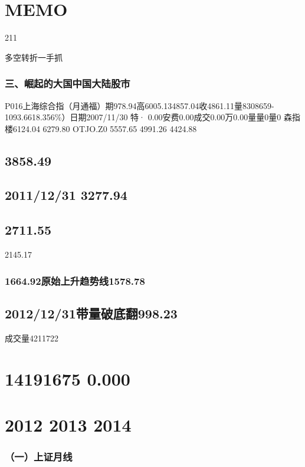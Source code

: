 \documentclass{article}
\begin{document}
\section{MEMO}

211

\clearpage

多空转折一手抓

\subsubsection{三、崛起的大国中国大陆股市}

P016上海综合指（月通福）期978.94高6005.134857.04收4861.11量8308659-1093.6618.356\%）日期2007/11/30 特· 0.00安费0.00成交0.00万0.00量量0量0 森指楼6124.04 6279.80 OTJO.Z0 5557.65 4991.26 4424.88

\subsection{3858.49}

\subsection{2011/12/31 3277.94}

\subsection{2711.55}

2145.17

\subsubsection{1664.92原始上升趋势线1578.78}

\subsection{2012/12/31带量破底翻998.23}

成交量4211722

\section{14191675 0.000}

\section{2012 2013 2014}

\subsubsection{（一）上证月线}
\end{document}
